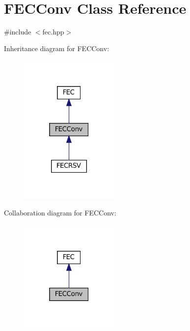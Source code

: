 \hypertarget{classFECConv}{}\section{F\+E\+C\+Conv Class Reference}
\label{classFECConv}


{\ttfamily \#include $<$fec.\+hpp$>$}



Inheritance diagram for F\+E\+C\+Conv\+:\nopagebreak
\begin{figure}[H]
\begin{center}
\leavevmode
\includegraphics[width=139pt]{classFECConv__inherit__graph}
\end{center}
\end{figure}


Collaboration diagram for F\+E\+C\+Conv\+:\nopagebreak
\begin{figure}[H]
\begin{center}
\leavevmode
\includegraphics[width=139pt]{classFECConv__coll__graph}
\end{center}
\end{figure}
